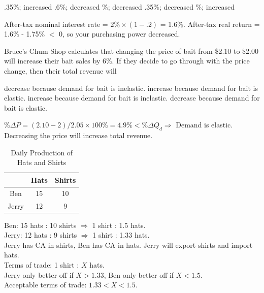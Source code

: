 \documentclass[addpoints,11pt]{exam}
\theoremstyle{definition}
\begin{document}
\begin{questions}
\begin{choices}
\choice .35\%; increased
\choice .6\%; decreased
\%; decreased
\choice .35\%; decreased
\%; increased
\end{choices}

\begin{solution}
After-tax nominal interest rate = $2\%\times(1-.2)$ = 1.6\%. After-tax real return = 1.6\% - 1.75\% $<$ 0, so your purchasing power decreased.
\end{solution}

\question Bruce's Chum Shop calculates that changing the price of bait from \$2.10 to \$2.00 will increase their bait sales by 6\%. If they decide to go through with the price change, then their total revenue will

\begin{choices}
	\choice decrease because demand for bait is inelastic.
	\CorrectChoice increase because demand for bait is elastic.
	\choice increase because demand for bait is inelastic.
	\choice decrease because demand for bait is elastic.
\end{choices}

\begin{solution}
	$\%\Delta P = (2.10 - 2)/2.05 \times 100\% = 4.9\% < \%\Delta Q_d \Rightarrow$ Demand is elastic. Decreasing the price will increase total revenue.
\end{solution}

\newpage


\begin{table}[h!]
	\caption{Daily Production of Hats and Shirts}
	\centering
	\begin{tabular}{ c|c|c} 
		
		& Hats & Shirts \\
		\hline
		Ben & 15 & 10 \\
		Jerry & 12 & 9 \\
	\end{tabular}
	\label{tab2}
\end{table}

\begin{solution}
	Ben: 15 hats : 10 shirts $\Rightarrow$ 1 shirt : 1.5 hats. \\
	Jerry: 12 hats : 9 shirts $\Rightarrow$ 1 shirt : 1.33 hats. \\
	Jerry has CA in shirts, Ben has CA in hats. Jerry will export shirts and import hats. \\
	Terms of trade: 1 shirt : $X$ hats. \\
	Jerry only better off if $X>1.33$, Ben only better off if $X<1.5$. \\
	Acceptable terms of trade: $1.33 < X < 1.5$.
\end{solution}


\end{questions}
\end{document}
